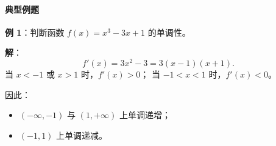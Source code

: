 \paragraph{典型例题}

\textbf{例 1}：判断函数 $f(x)=x^3-3x+1$ 的单调性。

\textbf{解}：
\[
f'(x)=3x^2-3=3(x-1)(x+1).
\]
当 $x<-1$ 或 $x>1$ 时，$f'(x)>0$；
当 $-1<x<1$ 时，$f'(x)<0$。

因此：
\begin{itemize}
  \item $(-\infty,-1)$ 与 $(1,+\infty)$ 上单调递增；
  \item $(-1,1)$ 上单调递减。
\end{itemize}
